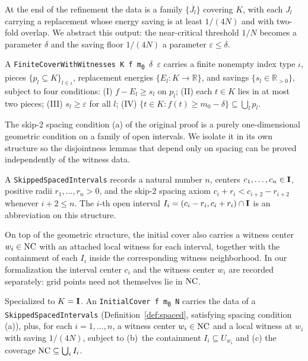 At the end of the refinement the data is a family
$\{\overline{J_l}\}$ covering $K$, with each $J_l$ carrying a
replacement whose energy saving is at least $1/(4N)$ and with
two-fold overlap. We abstract this output: the near-critical
threshold $1/N$ becomes a parameter $\delta$ and the saving floor
$1/(4N)$ a parameter $\varepsilon \le \delta$.

\begin{definition}
\label{def:ref}
A \texttt{FiniteCoverWithWitnesses K f m\textsubscript{0} $\delta$ $\varepsilon$}
carries a finite nonempty index type $\iota$, pieces
$\{p_l \subseteq K\}_{l \in \iota}$, replacement energies
$\{E_l : K \to \mathbb{R}\}$, and savings
$\{s_l \in \mathbb{R}_{>0}\}$, subject to four conditions:
(I) $f - E_l \ge s_l$ on $p_l$;
(II) each $t \in K$ lies in at most two pieces;
(III) $s_l \ge \varepsilon$ for all $l$;
(IV) $\{t \in K : f(t) \ge m_0 - \delta\} \subseteq \bigcup_l p_l$.
\end{definition}

The skip-2 spacing condition (a) of the original proof is a
purely one-dimensional geometric condition on a family of open
intervals. We isolate it in its own structure so the
disjointness lemmas that depend only on spacing can be proved
independently of the witness data.

\begin{definition}
\label{def:spaced}
A \texttt{SkippedSpacedIntervals} records a natural number $n$,
centers $c_1, \ldots, c_n \in \mathbf{I}$, positive radii
$r_1, \ldots, r_n > 0$, and the skip-2 spacing axiom
$c_i + r_i < c_{i+2} - r_{i+2}$ whenever $i+2 \le n$. The
$i$-th open interval $I_i = (c_i - r_i, c_i + r_i) \cap \mathbf{I}$
is an abbreviation on this structure.
\end{definition}

On top of the geometric structure, the initial cover also
carries a witness center $w_i \in \mathrm{NC}$ with an attached local
witness for each interval, together with the containment of
each $I_i$ inside the corresponding witness neighborhood. In our
formalization the interval center $c_i$ and the witness center
$w_i$ are recorded separately: grid points need not themselves
lie in $\mathrm{NC}$.

\begin{definition}
\label{def:ic}
Specialized to $K = \mathbf{I}$. An
\texttt{InitialCover f m\textsubscript{0} N} carries the data of
a \texttt{SkippedSpacedIntervals} (Definition~\ref{def:spaced},
satisfying spacing condition (a)), plus, for each
$i = 1, \ldots, n$, a witness center $w_i \in \mathrm{NC}$ and a local
witness at $w_i$ with saving $1/(4N)$, subject to (b)~the
containment $I_i \subseteq U_{w_i}$ and (c) the coverage
$\mathrm{NC} \subseteq \bigcup_i I_i$.
\end{definition}

